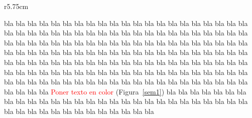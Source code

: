 \documentclass[12pt]{book}%
\theoremstyle{definition}%
\begin{document}
\begin{wrapfigure}{r}{5.75cm}
\begin{center}
\caption{Paralelogramo en el plano.}\label{sem1}
\end{center}
\end{wrapfigure}

bla bla bla bla bla bla bla bla bla bla bla bla bla bla bla bla bla bla bla bla bla bla bla bla bla bla bla bla bla bla bla bla bla bla bla bla bla bla bla bla bla bla bla bla bla bla bla bla bla bla bla bla bla bla bla bla bla bla bla bla bla bla bla bla bla bla bla bla bla bla bla bla bla bla bla bla bla bla bla bla bla bla bla bla bla bla bla bla bla bla bla bla bla bla bla bla bla bla bla bla bla bla bla bla bla bla bla bla bla bla bla bla bla bla bla bla bla bla bla bla bla bla bla bla bla bla bla bla bla bla bla bla bla bla bla bla bla bla bla bla bla bla bla bla bla bla bla bla bla bla bla \textcolor{red}{Poner texto en color} (Figura~\ref{sem1}) bla bla bla bla bla bla bla bla bla bla bla bla bla bla bla bla bla bla bla bla bla bla bla bla bla bla bla bla bla bla bla bla bla bla bla bla bla bla bla bla bla
\end{document}
